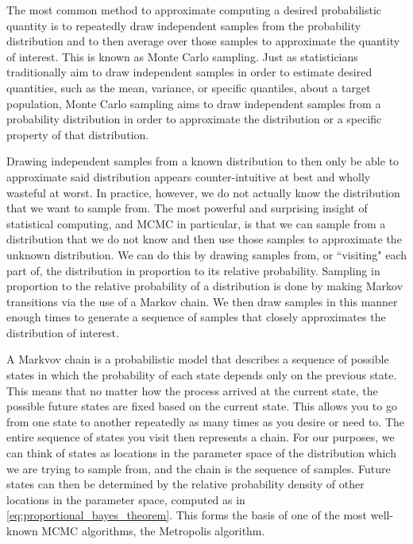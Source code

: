 The most common method to approximate computing a desired probabilistic quantity is to repeatedly draw independent samples from the probability distribution and to then average over those samples to approximate the quantity of interest. This is known as Monte Carlo sampling.  Just as statisticians traditionally aim to draw independent samples in order to estimate desired quantities, such as the mean, variance, or specific quantiles, about a target population, Monte Carlo sampling aims to draw independent samples from a probability distribution in order to approximate the distribution or a specific property of that distribution.

Drawing independent samples from a known distribution to then only be able to approximate said distribution appears counter-intuitive at best and wholly wasteful at worst. In practice, however, we do not actually know the distribution that we want to sample from. The most powerful and surprising insight of statistical computing, and MCMC in particular, is that we can sample from a distribution that we do not know and then use those samples to approximate the unknown distribution. We can do this by drawing samples from, or ``visiting" each part of, the distribution in proportion to its relative probability. Sampling in proportion to the relative probability of a distribution is done by making Markov transitions via the use of a Markov chain. We then draw samples in this manner enough times to generate a sequence of samples that closely approximates the distribution of interest.

A Markvov chain is a probabilistic model that describes a sequence of possible states in which the probability of each state depends only on the previous state. This means that no matter how the process arrived at the current state, the possible future states are fixed based on the current state. This allows you to go from one state to another repeatedly as many times as you desire or need to. The entire sequence of states you visit then represents a chain. For our purposes, we can think of states as locations in the parameter space of the distribution which we are trying to sample from, and the chain is the sequence of samples. Future states can then be determined by the relative probability density of other locations in the parameter space, computed as in \ref{eq:proportional_bayes_theorem}. This forms the basis of one of the most well-known MCMC algorithms, the Metropolis algorithm.


